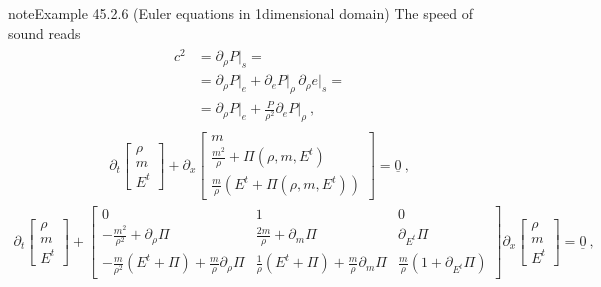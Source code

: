 \documentclass[letterpaper,10pt,english]{jupyterBook}
\begin{document}
\begin{sphinxadmonition}{note}{Example 45.2.6 (Euler equations in 1\sphinxhyphen{}dimensional domain)}
\sphinxAtStartPar
The speed of sound reads
\begin{equation*}
\begin{split}\begin{aligned}
  c^2
  & = \partial_\rho P\big|_s = \\
  & = \partial_\rho P\big|_e + \partial_e P\big|_{\rho} \, \partial_\rho e\big|_s = \\
  & = \partial_\rho P\big|_e + \frac{P}{\rho^2} \partial_e P \big|_{\rho} \ ,
\end{aligned}\end{split}
\end{equation*}
\sphinxAtStartPar
{}
\begin{equation*}
\begin{split}\partial_t \begin{bmatrix} \rho \\ m \\ E^t \end{bmatrix} + \partial_x \begin{bmatrix} m \\ \frac{m^2}{\rho} + \Pi(\rho,m,E^t) \\ \frac{m}{\rho} \left(E^t + \Pi(\rho, m, E^t)\right)  \end{bmatrix} = \underline{0} \ ,\end{split}
\end{equation*}
\sphinxAtStartPar
{}
\begin{equation*}
\begin{split}\partial_t \begin{bmatrix} \rho \\ m \\ E^t \end{bmatrix} + \begin{bmatrix} 0 & 1 & 0 \\ - \frac{m^2}{\rho^2} + \partial_\rho \Pi & \frac{2 m}{\rho} + \partial_m \Pi & \partial_{E^t} \Pi \\ - \frac{m}{\rho^2}(E^t+\Pi)+ \frac{m}{\rho}\partial_\rho \Pi & \frac{1}{\rho} (E^t + \Pi) + \frac{m}{ \rho} \partial_{m} \Pi & \frac{m}{\rho} \left( 1 + \partial_{E^t} \Pi \right)  \end{bmatrix} \partial_x \begin{bmatrix} \rho \\ m \\ E^t \end{bmatrix}  = \underline{0} \ ,\end{split}

\end{equation*}
\end{sphinxadmonition}
\end{document}
